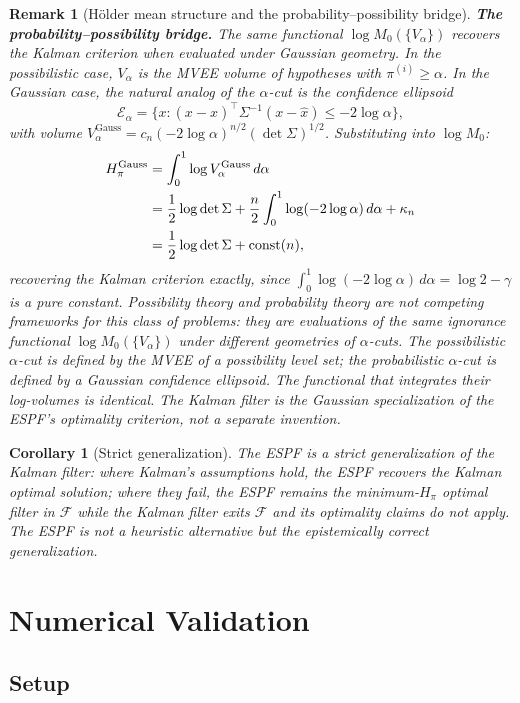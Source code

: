 \documentclass[12pt]{article}
\newtheorem{corollary}[theorem]{Corollary}
\newtheorem{remark}[theorem]{Remark}
\begin{document}
\begin{remark}[H\"{o}lder mean structure and the probability--possibility bridge]
\textbf{The probability--possibility bridge.} The same functional $\log M_0(\{V_\alpha\})$ recovers the Kalman criterion when evaluated under Gaussian geometry. In the possibilistic case, $V_\alpha$ is the MVEE volume of hypotheses with $\pi^{(i)} \geq \alpha$. In the Gaussian case, the natural analog of the $\alpha$-cut is the confidence ellipsoid
\[
\mathcal{E}_\alpha = \bigl\{x : (x - \hat{x})^\top \Sigma^{-1}(x - \hat{x}) \leq -2\log\alpha\bigr\},
\]
with volume $V_\alpha^{\mathrm{Gauss}} = c_n(-2\log\alpha)^{n/2}(\det\Sigma)^{1/2}$. Substituting into $\log M_0$:
\begin{align}
H_\pi^{\mathrm{Gauss}} &= \int_0^1 \log V_\alpha^{\mathrm{Gauss}}\,d\alpha \notag \\
&= \frac{1}{2}\log\det\Sigma + \frac{n}{2}\int_0^1\log(-2\log\alpha)\,d\alpha + \kappa_n \notag \\
&= \frac{1}{2}\log\det\Sigma + \mathrm{const}(n),
\end{align}
recovering the Kalman criterion exactly, since $\int_0^1\log(-2\log\alpha)\,d\alpha = \log 2 - \gamma$ is a pure constant. Possibility theory and probability theory are not competing frameworks for this class of problems: they are evaluations of the same ignorance functional $\log M_0(\{V_\alpha\})$ under different geometries of $\alpha$-cuts. The possibilistic $\alpha$-cut is defined by the MVEE of a possibility level set; the probabilistic $\alpha$-cut is defined by a Gaussian confidence ellipsoid. The functional that integrates their log-volumes is identical. The Kalman filter is the Gaussian specialization of the ESPF's optimality criterion, not a separate invention.
\end{remark}

\begin{corollary}[Strict generalization]
The ESPF is a strict generalization of the Kalman filter: where Kalman's assumptions hold, the ESPF recovers the Kalman optimal solution; where they fail, the ESPF remains the minimum-$H_\pi$ optimal filter in $\mathcal{F}$ while the Kalman filter exits $\mathcal{F}$ and its optimality claims do not apply. The ESPF is not a heuristic alternative but the epistemically correct generalization.
\end{corollary}

\section{Numerical Validation}
\label{sec:numerical}

\subsection{Setup}
\end{document}
